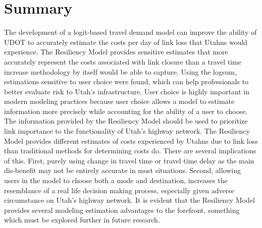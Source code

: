 \section{Summary}

The development of a logit-based travel demand model can improve the
ability of UDOT to accurately estimate the costs per day of link loss that
Utahns would experience. The Resiliency Model provides sensitive
estimates that more accurately represent the costs associated with link
closure than a travel time increase methodology by itself would be able to
capture. Using the logsum, estimations sensitive to user choice were
found, which can help professionals to better evaluate risk to Utah’s
infrastructure. User choice is highly important in modern modeling
practices because user choice allows a model to estimate information more
precisely while accounting for the ability of a user to choose. The information
provided by the Resiliency Model
should be used to prioritize link importance to the functionality of
Utah’s highway network. The Resiliency Model provides different estimates of
costs experienced by Utahns due to link loss than traditional methods for
determining costs do. There are several implications of this. First, purely
using change in travel time or travel time delay as the main dis-benefit may not
be entirely accurate in most situations. Second, allowing users in the model
to choose both a mode and destination, increases the resemblance of a real life
decision making process, especially given adverse circumstance on Utah's
highway network. It is evident that the Resiliency Model provides several
modeling estimation advantages to the forefront, something which must be
explored further in future research.
